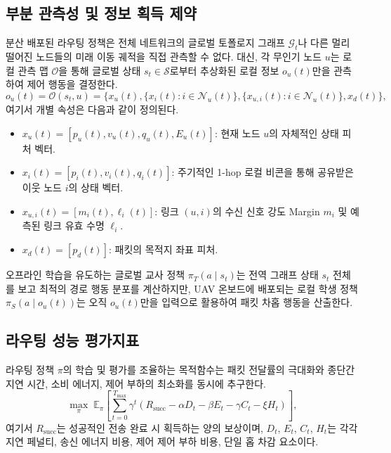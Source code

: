 \subsection{부분 관측성 및 정보 획득 제약}
분산 배포된 라우팅 정책은 전체 네트워크의 글로벌 토폴로지 그래프 $\mathcal{G}_t$나 다른 멀리 떨어진 노드들의 미래 이동 궤적을 직접 관측할 수 없다. 대신, 각 무인기 노드 $u$는 로컬 관측 맵 $\mathcal{O}$을 통해 글로벌 상태 $s_t \in \mathcal{S}$로부터 추상화된 로컬 정보 $o_u(t)$만을 관측하여 제어 행동을 결정한다.
\begin{equation}
    o_u(t) = \mathcal{O}(s_t, u) = \{x_u(t), \{x_i(t) : i \in \mathcal{N}_u(t)\}, \{x_{u,i}(t) : i \in \mathcal{N}_u(t)\}, x_d(t)\},
\end{equation}
여기서 개별 속성은 다음과 같이 정의된다.
\begin{itemize}
    \item $x_u(t) = [p_u(t), v_u(t), q_u(t), E_u(t)]$: 현재 노드 $u$의 자체적인 상태 피처 벡터.
    \item $x_i(t) = [p_i(t), v_i(t), q_i(t)]$: 주기적인 1-hop 로컬 비콘을 통해 공유받은 이웃 노드 $i$의 상태 벡터.
    \item $x_{u,i}(t) = [m_i(t), \ell_i(t)]$: 링크 $(u, i)$의 수신 신호 강도 Margin $m_i$ 및 예측된 링크 유효 수명 $\ell_i$.
    \item $x_d(t) = [p_d(t)]$: 패킷의 목적지 좌표 피처.
\end{itemize}

오프라인 학습을 유도하는 글로벌 교사 정책 $\pi_T(a \mid s_t)$는 전역 그래프 상태 $s_t$ 전체를 보고 최적의 경로 행동 분포를 계산하지만, UAV 온보드에 배포되는 로컬 학생 정책 $\pi_S(a \mid o_u(t))$는 오직 $o_u(t)$만을 입력으로 활용하여 패킷 차홉 행동을 산출한다.

\subsection{라우팅 성능 평가지표}
라우팅 정책 $\pi$의 학습 및 평가를 조율하는 목적함수는 패킷 전달률의 극대화와 종단간 지연 시간, 소비 에너지, 제어 부하의 최소화를 동시에 추구한다.
\begin{equation}
    \max_{\pi} \; \mathbb{E}_{\pi} \left[ \sum_{t=0}^{T_{\mathrm{max}}} \gamma^t \left( R_{\mathrm{succ}} - \alpha D_t - \beta E_t - \gamma C_t - \xi H_t \right) \right],
\end{equation}
여기서 $R_{\mathrm{succ}}$는 성공적인 전송 완료 시 획득하는 양의 보상이며, $D_t$, $E_t$, $C_t$, $H_t$는 각각 지연 페널티, 송신 에너지 비용, 제어 제어 부하 비용, 단일 홉 차감 요소이다.

